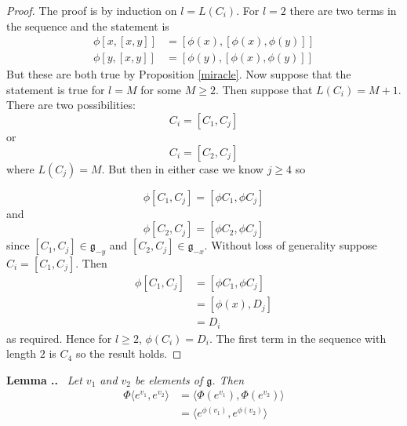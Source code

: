 \documentclass[honours]{UNSWthesis}
\newcommand{\g}{\mathfrak{g}}
\newcommand{\1}{\mathbf{e}_{1}}
\newcommand{\2}{\mathbf{e}_{3}}
\newcommand{\3}{\mathbf{e}_{3}}
\newcounter{Item}[section]
\newenvironment{Lemma}{\medskip
                            \refstepcounter{Item}
                            \noindent
                           {\bf Lemma \thesection.\theItem.}\ %
                            \begingroup \sl}
                           {\endgroup\medskip}
\begin{document}
\begin{proof}
The proof is by induction on $l=L(C_{i})$. For $l=2$ there are two terms in the sequence and the statement is 
\begin{align*}
\phi[x,[x,y]]&=[\phi(x),[\phi(x),\phi(y)]] \\
\phi[y,[x,y]]&=[\phi(y),[\phi(x),\phi(y)]]
\end{align*}
But these are both true by Proposition \ref{miracle}. \newline
Now suppose that the statement is true for $l=M$ for some $M \geq 2$. Then suppose that $L(C_{i})=M+1$. There are two possibilities:
\[
C_{i}=[C_{1},C_{j}]
\]
or 
\[
C_{i}=[C_{2},C_{j}]
\]
where $L(C_{j})=M$. But then in either case we know $j\geq 4$ so

\[
\phi[C_{1},C_{j}]=[\phi C_{1},\phi C_{j}]
\]
and
\[
\phi[C_{2},C_{j}]=[\phi C_{2},\phi C_{j}]
\]
since $[C_{1},C_{j}] \in \g_{-y}$ and $[C_{2},C_{j}] \in \g_{-x}$. 
Without loss of generality suppose $C_{i}=[C_{1},C_{j}]$. Then 
\begin{align*}
\phi[C_{1},C_{j}] &=[\phi C_{1},\phi C_{j}] \\
&=[\phi(x),D_{j}]\\
&=D_{i}
\end{align*}
 as required. 
Hence for $l\geq 2$, $\phi(C_{i})=D_{i}$. The first term in the sequence with length $2$ is $C_{4}$ so the result holds. 
\end{proof}

\begin{Lemma}\label{Groupimage}
Let $v_{1}$ and $v_{2}$ be elements of $\g$. Then 
\begin{align*}
\Phi \langle e^{v_{1}},e^{v_{2}} \rangle &=  \langle \Phi(e^{v_{1}}), \Phi(e^{v_{2}}) \rangle \\ 
&= \langle e^{\phi(v_{1})}, e^{\phi(v_{2})} \rangle
\end{align*}

\end{Lemma}
\end{document}

